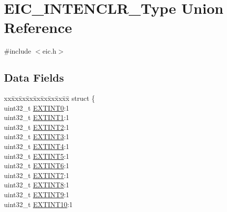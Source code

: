 \hypertarget{union_e_i_c___i_n_t_e_n_c_l_r___type}{}\section{E\+I\+C\+\_\+\+I\+N\+T\+E\+N\+C\+L\+R\+\_\+\+Type Union Reference}
\label{union_e_i_c___i_n_t_e_n_c_l_r___type}


{\ttfamily \#include $<$eic.\+h$>$}

\subsection*{Data Fields}
\begin{DoxyCompactItemize}
\item 
\begin{tabbing}
xx\=xx\=xx\=xx\=xx\=xx\=xx\=xx\=xx\=\kill
struct \{\\
\>uint32\_t \mbox{\hyperlink{union_e_i_c___i_n_t_e_n_c_l_r___type_abf48df6e6aba15d7c5c32780d797e303}{EXTINT0}}:1\\
\>uint32\_t \mbox{\hyperlink{union_e_i_c___i_n_t_e_n_c_l_r___type_a0fcc07121c60150909b8cd851f7107a5}{EXTINT1}}:1\\
\>uint32\_t \mbox{\hyperlink{union_e_i_c___i_n_t_e_n_c_l_r___type_ac22e13e7a1e49df3ca9d32b9abade6cb}{EXTINT2}}:1\\
\>uint32\_t \mbox{\hyperlink{union_e_i_c___i_n_t_e_n_c_l_r___type_a6bbe860ee6b1e9843ce1958b88160a3d}{EXTINT3}}:1\\
\>uint32\_t \mbox{\hyperlink{union_e_i_c___i_n_t_e_n_c_l_r___type_afacd28dc6b8e38374f87619ec39d4dcb}{EXTINT4}}:1\\
\>uint32\_t \mbox{\hyperlink{union_e_i_c___i_n_t_e_n_c_l_r___type_aa752c741b9b2e2cc40192797955f9636}{EXTINT5}}:1\\
\>uint32\_t \mbox{\hyperlink{union_e_i_c___i_n_t_e_n_c_l_r___type_ac8c3b2520eaffe74aad83731fa9eba81}{EXTINT6}}:1\\
\>uint32\_t \mbox{\hyperlink{union_e_i_c___i_n_t_e_n_c_l_r___type_a33bcabe57bdd1f0cec51aba92174fda6}{EXTINT7}}:1\\
\>uint32\_t \mbox{\hyperlink{union_e_i_c___i_n_t_e_n_c_l_r___type_aab9d762f86dec3f39445ee2ad1c41196}{EXTINT8}}:1\\
\>uint32\_t \mbox{\hyperlink{union_e_i_c___i_n_t_e_n_c_l_r___type_abd6774c81c28d04fbef1daa87929c1d3}{EXTINT9}}:1\\
\>uint32\_t \mbox{\hyperlink{union_e_i_c___i_n_t_e_n_c_l_r___type_a1c59062a462e17292e550f8447adce30}{EXTINT10}}:1\\

\end{tabbing}
\end{DoxyCompactItemize}
